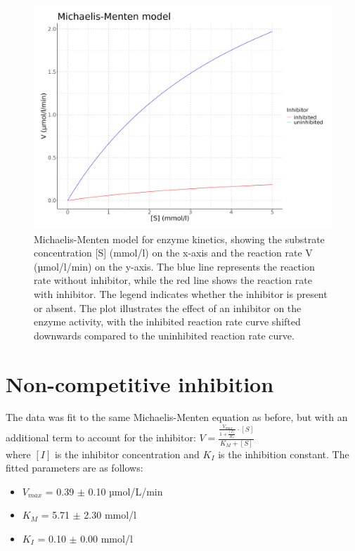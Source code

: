 \documentclass{article}
\begin{document}
\begin{figure}[H]
\centering
\includegraphics[width=1.0\textwidth, height=0.5\textheight]{plots/model_fit_plot2.png}
\caption{Michaelis-Menten model for enzyme kinetics, showing the substrate concentration [S] (mmol/l) 
on the x-axis and the reaction rate V (µmol/l/min) on the y-axis. The blue line represents the reaction 
rate without inhibitor, while the red line shows the reaction rate with inhibitor. The legend indicates 
whether the inhibitor is present or absent. The plot illustrates the effect of an inhibitor on the enzyme 
activity, with the inhibited reaction rate curve shifted downwards compared to the uninhibited reaction rate curve.}
\label{fig:enzyme_kinetics}
\end{figure}

\section{Non-competitive inhibition}

The data was fit to the same Michaelis-Menten equation as before, but with an additional term to account for 
the inhibitor: $    V =\displaystyle \frac{\displaystyle \frac{V_{max}}{1 + \frac{[I]}{K_{I}}} \cdot [S]}{K_{M} + [S]}
$\\ where $[I]$ is the inhibitor 
concentration and $K_{I}$ is the inhibition constant. The fitted parameters are as follows:
\begin{itemize}
\item $V_{max}$ = 0.39 $\pm$ 0.10 µmol/L/min
\item $K_{M}$ = 5.71 $\pm$ 2.30 mmol/l
\item $K_{I}$ = 0.10 $\pm$ 0.00 mmol/l
\end{itemize}
\end{document}
